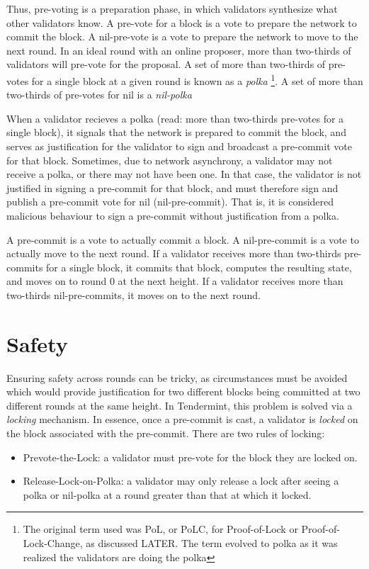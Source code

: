 Thus, pre-voting is a preparation phase, in which validators synthesize what other validators know.
A pre-vote for a block is a vote to prepare the network to commit the block.
A nil-pre-vote is a vote to prepare the network to move to the next round.
In an ideal round with an online proposer, more than two-thirds of validators will pre-vote for the proposal.
A set of more than two-thirds of pre-votes for a single block at a given round is known as a \emph{polka} \footnote{The original term used was PoL, or PoLC, for Proof-of-Lock or Proof-of-Lock-Change, as discussed LATER. The term evolved to polka as it was realized the validators are doing the polka}.
A set of more than two-thirds of pre-votes for nil is a \emph{nil-polka}

When a validator recieves a polka (read: more than two-thirds pre-votes for a single block), 
it signals that the network is prepared to commit the block,
and serves as justification for the validator to sign and broadcast a pre-commit vote for that block.
Sometimes, due to network asynchrony, a validator may not receive a polka, or there may not have been one. 
In that case, the validator is not justified in signing a pre-commit for that block, 
and must therefore sign and publish a pre-commit vote for nil (nil-pre-commit).
That is, it is considered malicious behaviour to sign a pre-commit without justification from a polka.

A pre-commit is a vote to actually commit a block.
A nil-pre-commit is a vote to actually move to the next round.
If a validator receives more than two-thirds pre-commits for a single block, 
it commits that block, computes the resulting state,
and moves on to round 0 at the next height.
If a validator receives more than two-thirds nil-pre-commits,
it moves on to the next round.

\section{Safety}

Ensuring safety across rounds can be tricky, 
as circumstances must be avoided which would provide justification for two different blocks being committed at two different rounds at the same height.
In Tendermint, this problem is solved via a \emph{locking} mechanism.
In essence, once a pre-commit is cast, a validator is \emph{locked} on the block associated with the pre-commit.
There are two rules of locking:

\begin{itemize}
\item{Prevote-the-Lock: a validator must pre-vote for the block they are locked on.}
\item{Release-Lock-on-Polka: a validator may only release a lock after seeing a polka or nil-polka at a round greater than that at which it locked.}
\end{itemize}

